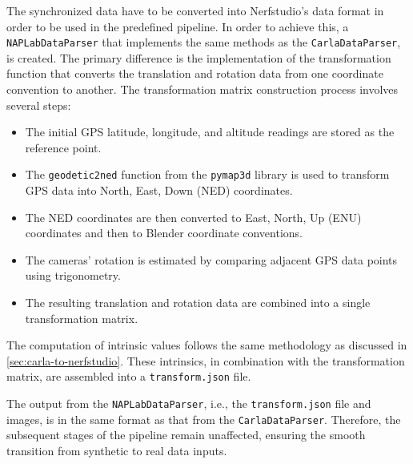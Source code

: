 The synchronized data have to be converted into Nerfstudio's data format in order to be used in the predefined pipeline. In order to achieve this, a \texttt{NAPLabDataParser} that implements the same methods as the \texttt{CarlaDataParser}, is created. The primary difference is the implementation of the transformation function that converts the translation and rotation data from one coordinate convention to another. The transformation matrix construction process involves several steps:

\begin{itemize}
    \item The initial GPS latitude, longitude, and altitude readings are stored as the reference point.
    \item The \texttt{geodetic2ned} function from the \texttt{pymap3d} library \cite{Hirsch_PyGemini} is used to transform GPS data into North, East, Down (NED) coordinates.
    \item The NED coordinates are then converted to East, North, Up (ENU) coordinates and then to Blender coordinate conventions.
    \item The cameras' rotation is estimated by comparing adjacent GPS data points using trigonometry.
    \item The resulting translation and rotation data are combined into a single transformation matrix.
\end{itemize}

The computation of intrinsic values follows the same methodology as discussed in \autoref{sec:carla-to-nerfstudio}. These intrinsics, in combination with the transformation matrix, are assembled into a \texttt{transform.json} file.

The output from the \texttt{NAPLabDataParser}, i.e., the \texttt{transform.json} file and images, is in the same format as that from the \texttt{CarlaDataParser}. Therefore, the subsequent stages of the pipeline remain unaffected, ensuring the smooth transition from synthetic to real data inputs.





